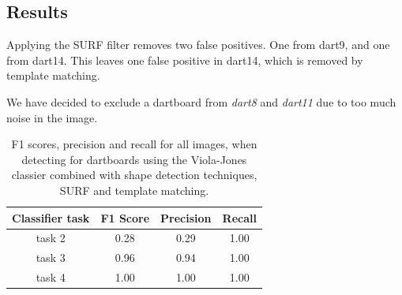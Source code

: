 \documentclass[conference]{IEEEtran}
\begin{document}
\subsection{Results}
Applying the SURF filter removes two false positives. One from dart9, and one from dart14. This leaves one false positive in dart14, which is removed by template matching. 
\par
We have decided to exclude a dartboard from \emph{dart8} and \emph{dart11} due to too much noise in the image. 
\begin{table}[!htp]
\caption{F1 scores, precision and recall for all images, when detecting for dartboards using the Viola-Jones classier combined with shape detection techniques, SURF and template matching. }
\begin{center}
\begin{tabular}{||c|c|c|c||}
\hline
Classifier task		 	& F1 Score 	& Precision	& Recall            \\ \hline
task 2				& 0.28		&	0.29		& 1.00		\\
task 3				& 0.96		&	0.94		& 1.00		\\
task 4				& 1.00		&	1.00		& 1.00		\\\hline

\end{tabular}
\end{center}
\label{default}
\end{table}


\end{document}
